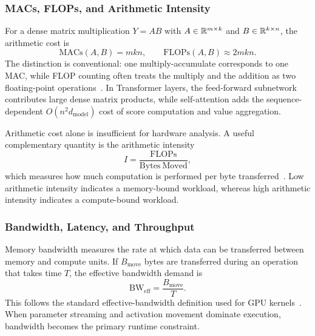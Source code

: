 \subsubsection{MACs, FLOPs, and Arithmetic Intensity}

For a dense matrix multiplication $Y = AB$ with $A \in \mathbb{R}^{m \times k}$ and $B \in \mathbb{R}^{k \times n}$, the arithmetic cost is
\begin{equation}
\mathrm{MACs}(A,B) = mkn,
\qquad
\mathrm{FLOPs}(A,B) \approx 2mkn.
\end{equation}
The distinction is conventional: one multiply-accumulate corresponds to one MAC, while FLOP counting often treats the multiply and the addition as two floating-point operations~\cite{NVIDIAMatrixMultiplication}. In Transformer layers, the feed-forward subnetwork contributes large dense matrix products, while self-attention adds the sequence-dependent $O(n^2 d_{\text{model}})$ cost of score computation and value aggregation.

Arithmetic cost alone is insufficient for hardware analysis. A useful complementary quantity is the arithmetic intensity
\begin{equation}
I = \frac{\mathrm{FLOPs}}{\mathrm{Bytes\ Moved}},
\end{equation}
which measures how much computation is performed per byte transferred~\cite{Williams2009Roofline,NVIDIAMatrixMultiplication}. Low arithmetic intensity indicates a memory-bound workload, whereas high arithmetic intensity indicates a compute-bound workload.

\subsubsection{Bandwidth, Latency, and Throughput}

Memory bandwidth measures the rate at which data can be transferred between memory and compute units. If $B_{\text{move}}$ bytes are transferred during an operation that takes time $T$, the effective bandwidth demand is
\begin{equation}
\mathrm{BW}_{\text{eff}} = \frac{B_{\text{move}}}{T}.
\end{equation}
This follows the standard effective-bandwidth definition used for GPU kernels~\cite{CUDABestPractices}.
When parameter streaming and activation movement dominate execution, bandwidth becomes the primary runtime constraint.

